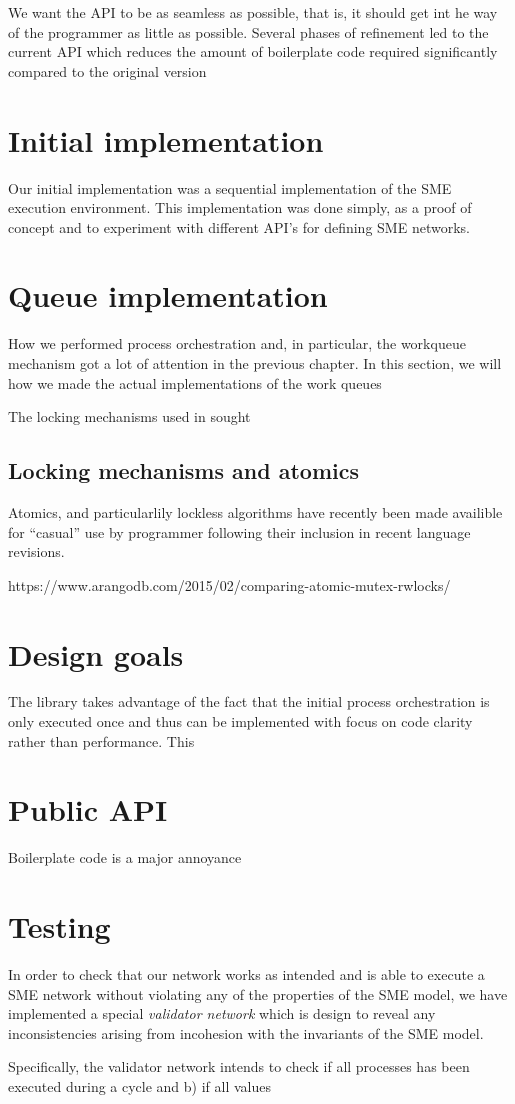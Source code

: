 We want the API to be as seamless as possible, that is, it should get
int he way of the programmer as little as possible. Several phases of
refinement led to the current API which reduces the amount of
boilerplate code required  significantly compared to the original version

\section{Initial implementation}
Our initial implementation was a sequential implementation of the
SME execution environment. This implementation was done simply, as a
proof of concept and to experiment with different API's for defining
SME networks.

\section{Queue implementation}
How we performed process orchestration and, in particular, the
workqueue mechanism got a lot of attention in the previous chapter. In
this section, we will how we made the actual implementations of the
work queues

The locking mechanisms used in sought 

\subsection{Locking mechanisms and atomics}
Atomics, and particularlily lockless algorithms have recently been
made availible for ``casual'' use by programmer following their
inclusion in recent language revisions.

https://www.arangodb.com/2015/02/comparing-atomic-mutex-rwlocks/

\section{Design goals}
The library takes advantage of the fact that the initial process
orchestration is only executed once and thus can be implemented with
focus on code clarity rather than performance. This 

\section{Public API}
Boilerplate code is a major annoyance 

\section{Testing}
In order to check that our network works as intended and is able to
execute a SME network without violating any of the properties of the
SME model, we have implemented a special \textit{validator network}
which is design to reveal any inconsistencies arising from
incohesion with the invariants of the SME
model.

Specifically, the validator network intends to check if all processes
has been executed during a cycle and b) if all values 


